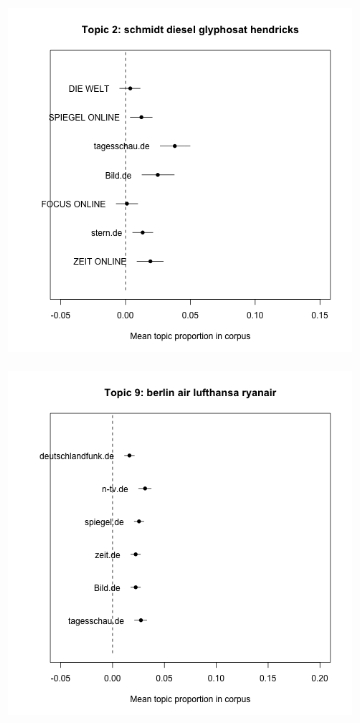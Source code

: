 \documentclass[12pt,a4paper,notitlepage]{article}
\begin{document}
\begin{figure}[H]
	\caption{Mean prevalence of topics within each news source corpus}
	\begin{center}
		\begin{subfigure}[normla]{0.3\textwidth}
			\includegraphics[width=\textwidth]{../figs/estimate_effect2.png}
		\end{subfigure}
		\begin{subfigure}[normla]{0.3\textwidth}
			\includegraphics[width=\textwidth]{../figs/estimate_effect9.png}

\end{subfigure}
\end{center}
\end{figure}
\end{document}
